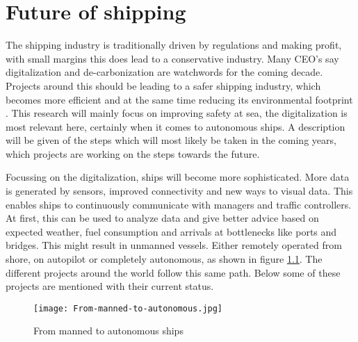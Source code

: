 \chapter{Future of shipping}
\label{sec:future}
The shipping industry is traditionally driven by regulations and making profit, with small margins this does lead to a conservative industry. Many CEO's say digitalization and de-carbonization are watchwords for the coming decade. Projects around this should be leading to a safer shipping industry, which becomes more efficient and at the same time reducing its environmental footprint \cite{Eriksen2017}. This research will mainly focus on improving safety at sea, the digitalization is most relevant here, certainly when it comes to autonomous ships. A description will be given of the steps which will most likely be taken in the coming years, which projects are working on the steps towards the future.

Focussing on the digitalization, ships will become more sophisticated. More data is generated by sensors, improved connectivity and new ways to visual data. This enables ships to continuously communicate with managers and traffic controllers. At first, this can be used to analyze data and give better advice based on expected weather, fuel consumption and arrivals at bottlenecks like ports and bridges.
This might result in unmanned vessels. Either remotely operated from shore, on autopilot or completely autonomous, as shown in figure \ref{fig:From-manned-to-autonomous}. The different projects around the world follow this same path. Below some of these projects are mentioned with their current status.

\begin{figure}[hb]
	\centering
	\texttt{[image: From-manned-to-autonomous.jpg]}
	\caption{From manned to autonomous ships}
	\label{fig:From-manned-to-autonomous}
\end{figure}



